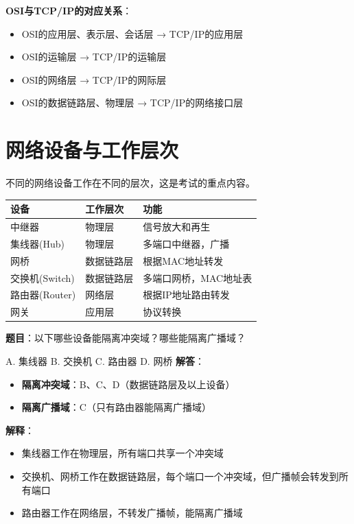 \begin{notebox}
\textbf{OSI与TCP/IP的对应关系}：
\begin{itemize}[itemsep=0pt]
    \item OSI的应用层、表示层、会话层 → TCP/IP的应用层
    \item OSI的运输层 → TCP/IP的运输层
    \item OSI的网络层 → TCP/IP的网际层
    \item OSI的数据链路层、物理层 → TCP/IP的网络接口层
\end{itemize}
\end{notebox}

\section{网络设备与工作层次}
不同的网络设备工作在不同的层次，这是考试的重点内容。

\begin{table}[htbp]
\centering
\begin{tabular}{lll}
\toprule
\textbf{设备} & \textbf{工作层次} & \textbf{功能} \\
\midrule
中继器 & 物理层 & 信号放大和再生 \\
集线器(Hub) & 物理层 & 多端口中继器，广播 \\
网桥 & 数据链路层 & 根据MAC地址转发 \\
交换机(Switch) & 数据链路层 & 多端口网桥，MAC地址表 \\
路由器(Router) & 网络层 & 根据IP地址路由转发 \\
网关 & 应用层 & 协议转换 \\
\bottomrule
\end{tabular}
\end{table}

\begin{examplebox}[例题1.4 设备工作层次]
\textbf{题目}：以下哪些设备能隔离冲突域？哪些能隔离广播域？

A. 集线器  B. 交换机  C. 路由器  D. 网桥
\tcblower
\textbf{解答}：
\begin{itemize}[itemsep=0pt]
    \item \textbf{隔离冲突域}：B、C、D（数据链路层及以上设备）
    \item \textbf{隔离广播域}：C（只有路由器能隔离广播域）
\end{itemize}

\textbf{解释}：
\begin{itemize}[itemsep=0pt]
    \item 集线器工作在物理层，所有端口共享一个冲突域
    \item 交换机、网桥工作在数据链路层，每个端口一个冲突域，但广播帧会转发到所有端口
    \item 路由器工作在网络层，不转发广播帧，能隔离广播域
\end{itemize}
\end{examplebox}

